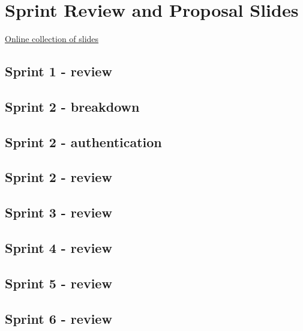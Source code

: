
\chapter{Sprint Review and Proposal Slides}
\label{appendix:slides}

\href{https://goo.gl/BR75HN}{Online collection of slides}

\section{Sprint 1 - review}
\label{appendix:slides_1}


\section{Sprint 2 - breakdown}
\label{appendix:slides_2_breakdown}


\section{Sprint 2 - authentication}
\label{appendix:slides_2_authentication}


\section{Sprint 2 - review}
\label{appendix:slides_2}


\section{Sprint 3 - review}
\label{appendix:slides_3}


\section{Sprint 4 - review}
\label{appendix:slides_4}


\section{Sprint 5 - review}
\label{appendix:slides_5}


\section{Sprint 6 - review}
\label{appendix:slides_6}

